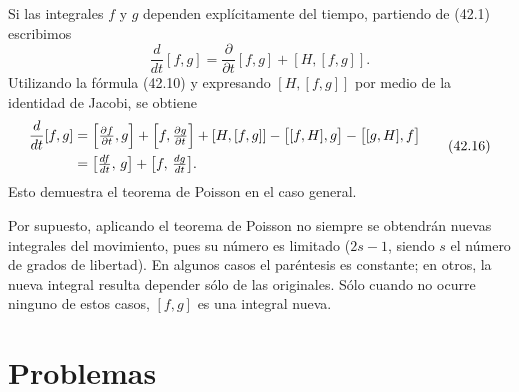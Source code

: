 \documentclass[12pt]{article}
\begin{document}
Si las integrales \(f\) y \(g\) dependen explícitamente del tiempo, partiendo de (42.1) escribimos
\[
\frac{d}{dt}[f,g]
=\frac{\partial}{\partial t}[f,g]+[H,[f,g]].
\]
Utilizando la fórmula (42.10) y expresando \([H,[f,g]]\) por medio de la identidad de Jacobi, se obtiene
\[
\begin{aligned}
\frac{d}{dt}[f,g]
&=\Bigl[\tfrac{\partial f}{\partial t},g\Bigr]
 +\Bigl[f,\tfrac{\partial g}{\partial t}\Bigr]
 +[H,[f,g]]
 -\bigl[[f,H],g\bigr]
 -\bigl[[g,H],f\bigr]\\
&=\bigl[\tfrac{df}{dt},\,g\bigr]
 +\bigl[f,\,\tfrac{dg}{dt}\bigr].
\end{aligned}
\tag{42.16}
\]
Esto demuestra el teorema de Poisson en el caso general.

Por supuesto, aplicando el teorema de Poisson no siempre se obtendrán nuevas integrales del movimiento, pues su número es limitado (\(2s-1\), siendo \(s\) el número de grados de libertad). En algunos casos el paréntesis es constante; en otros, la nueva integral resulta depender sólo de las originales. Sólo cuando no ocurre ninguno de estos casos, \([f,g]\) es una integral nueva.

\section*{Problemas}
\end{document}
